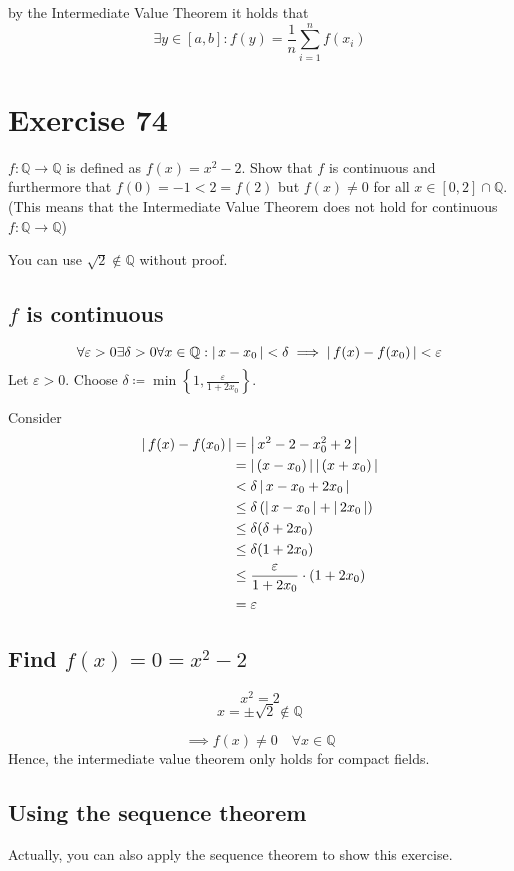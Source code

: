 \documentclass[a4paper]{article}
\theoremstyle{definition}
\newcommand\abs[1]{\left|\thinspace #1\thinspace\right|}
\newcommand\set[1]{\left\{#1\right\}}
\begin{document}
by the Intermediate Value Theorem it holds that
\[ \exists y \in [a,b]: f(y) = \frac1n \sum_{i=1}^n f(x_i) \]

\section{Exercise 74}
\begin{ex}
  $f: \mathbb Q \to \mathbb Q$ is defined as $f(x) = x^2 - 2$. Show that $f$ is continuous and furthermore
  that $f(0) = -1 < 2 = f(2)$ but $f(x) \neq 0$ for all $x \in [0,2] \cap \mathbb Q$.
  (This means that the Intermediate Value Theorem does not hold for continuous $f: \mathbb Q \to \mathbb Q$)

  You can use $\sqrt{2} \not\in \mathbb Q$ without proof.
\end{ex}

\subsection{$f$ is continuous}
\[ \forall \varepsilon > 0 \exists \delta > 0 \forall x \in \mathbb Q: \abs{x - x_0} < \delta \implies \abs{f(x) - f(x_0)} < \varepsilon \]
Let $\varepsilon > 0$. Choose $\delta \coloneqq \min\set{1, \frac{\varepsilon}{1 + 2x_0}}$.

Consider
\begin{align*}
  \abs{f(x) - f(x_0)}
    &= \abs{x^2 - 2 - x_0^2 + 2} \\
    &= \abs{(x - x_0)} \abs{(x + x_0)} \\
    &< \delta \abs{x - x_0 + 2x_0} \\
    &\leq \delta \left(\abs{x - x_0} + \abs{2x_0}\right) \\
    &\leq \delta(\delta + 2x_0) \\
    &\leq \delta(1 + 2x_0) \\
    &\leq \frac{\varepsilon}{1 + 2x_0} \cdot (1 + 2x_0) \\
    &= \varepsilon
\end{align*}

\subsection{Find $f(x) = 0 = x^2 - 2$}
%
\[ x^2 = 2 \]
\[ x = \pm \sqrt{2} \not\in \mathbb Q \]

\[ \implies f(x) \neq 0 \quad \forall x \in \mathbb Q \]
Hence, the intermediate value theorem only holds for compact fields.

\subsection{Using the sequence theorem}
%
Actually, you can also apply the sequence theorem to show this exercise.
\end{document}
